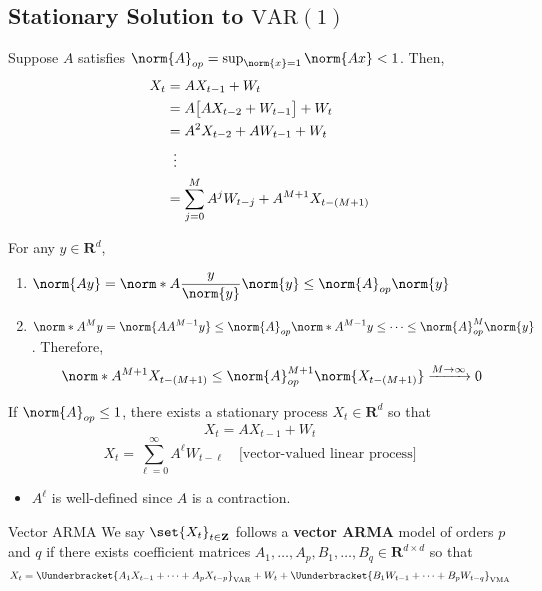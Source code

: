 \subsection*{Stationary Solution to $ \text{VAR}(1) $}
Suppose $ A $ satisfies $ \norm{A}_{op}=\sup_{\norm{x}=1}\norm{Ax}<1 $.
Then,
\begin{align*}
    X_t
     & =A X_{t-1}+W_t                                   \\
     & =A\bigl[A X_{t-2}+W_{t-1}\bigr]+W_t              \\
     & =A^2 X_{t-2}+ A W_{t-1}+W_t                      \\
     & \vdotswithin{=}                                  \\
     & =\sum_{j=0}^{M} A^j W_{t-j}+ A^{M+1} X_{t-(M+1)}
\end{align*}
\begin{Remark}{}{}
    For any $ y\in\mathbf{R}^d $,
    \begin{enumerate}[(1)]
        \item $ \displaystyle \norm{A y}=\norm*{A \frac{y}{\norm{y}}}\norm{y}\le \norm{A}_{op}\norm{y} $
        \item $ \displaystyle \norm*{A^M y}=\norm {A A^{M-1}y}\le \norm{A}_{op}\norm*{A^{M-1}y}\le \cdots\le \norm{A}_{op}^M\norm{y} $.
              Therefore,
              \[ \norm*{A^{M+1}X_{t-(M+1)}}\le \norm{A}_{op}^{M+1}\norm {X_{t-(M+1)}}\xrightarrow{M\to\infty}0 \]
    \end{enumerate}
\end{Remark}
\begin{Theorem}{}{}
    If $ \norm{A}_{op}\le 1 $, there exists a stationary process $ X_t\in\mathbf{R}^d $
    so that
    \[ X_t= A X_{t-1}+W_t \]
    \[ X_t=\sum_{\ell=0}^{\infty} A^\ell W_{t-\ell}\quad\text{[vector-valued linear process]} \]
    \begin{itemize}
        \item $ A^\ell $ is well-defined since $ A $ is a contraction.
    \end{itemize}
\end{Theorem}
\begin{Definition}{Vector ARMA}{}
    We say $ \set{X_t}_{t\in\mathbf{Z}} $ follows a \textbf{vector ARMA} model of orders
    $ p $ and $ q $ if there exists coefficient matrices $ A_1,\ldots, A_p,
        B_1,\ldots,B_q\in\mathbf{R}^{d\times d} $ so that
    \[ X_t=\Uunderbracket{A_1 X_{t-1}+\cdots+ A_p X_{t-p}}_{\text{VAR}}+W_t+\Uunderbracket{B_1 W_{t-1}+\cdots+B_p W_{t-q}}_{\text{VMA}} \]
\end{Definition}
